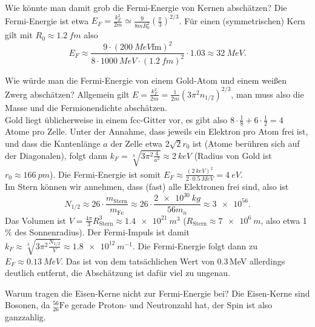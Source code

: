 \begin{fquestion}{Wie könnte man damit grob die Fermi-Energie von Kernen abschätzen?}
    Die Fermi-Energie ist etwa $E_F=\frac{k_F^2}{2m} \simeq \frac{9}{8mR_0^2} \left(\frac{\pi}{3}\right)^{2/3}$.
    Für einen (symmetrischen) Kern gilt mit $R_0 \approx \SI{1.2}{fm}$ also 
    $$E_F \approx \frac{9\cdot (\SI{200}{MeV\femto\metre})^2}{8\cdot \SI{1000}{MeV} \cdot (\SI{1.2}{fm})^2 } \cdot 1.03 \approx \SI{32}{MeV}. $$
\end{fquestion}

\begin{fquestion}{Wie würde man die Fermi-Energie von einem Gold-Atom und einem weißen Zwerg abschätzen?}
    Allgemein gilt $E = \frac{k_F^2}{2m} = \frac{1}{2m} \left( 3\pi^2 n_{1/2} \right)^{2/3}$, man muss also die Masse und die Fermionendichte abschätzen.
    \\
    Gold liegt üblicherweise in einem fcc-Gitter vor, es gibt also $8\cdot \frac{1}{8} + 6\cdot\frac{1}{2} = 4$ Atome pro Zelle.
    Unter der Annahme, dass jeweils ein Elektron pro Atom frei ist, und dass die Kantenlänge $a$ der Zelle etwa $2\sqrt{2} r_0$ ist (Atome berühren sich auf der Diagonalen), folgt dann $k_F = \sqrt[3]{3\pi^2 \frac{4}{a^3}} \approx \SI{2}{keV}$ (Radius von Gold ist $r_0\approx \SI{166}{pm}$).
    Die Fermi-Energie ist somit $E_F \approx \frac{(\SI{2}{keV})^2}{2\cdot \SI{0.5}{MeV}} = \SI{4}{eV}.$
    \\
    Im Stern können wir annehmen, dass (fast) alle Elektronen frei sind, also ist 
    $$N_{1/2} \approx 26\cdot \frac{m_\mathrm{Stern}}{m_\mathrm{Fe}} \approx 26\cdot \frac{\SI{2e30}{kg}}{56m_n} \approx \SI{3e56}.$$
    Das Volumen ist $V = \frac{4\pi }{3} R_\mathrm{Stern}^3 \approx \SI{1.4e21}{m^3}$ ($R_\mathrm{Stern} \approx \SI{7e6}{m}$, also etwa 1\,\% des Sonnenradius).
    Der Fermi-Impuls ist damit $k_F \approx \sqrt[3]{3\pi^2 \frac{N_{1/2} }{V}} \approx \SI{1.8e12}{m^{-1}}$.
    Die Fermi-Energie folgt dann zu $E_F \approx \SI{0.13}{MeV}$.
    Das ist von dem tatsächlichen Wert von $0.3\,$MeV allerdings deutlich entfernt, die Abschätzung ist dafür viel zu ungenau.
\end{fquestion}

\begin{fquestion}{Warum tragen die Eisen-Kerne nicht zur Fermi-Energie bei?}
    Die Eisen-Kerne sind Bosonen, da ${}^{56}_{26}\mathrm{Fe}$ gerade Proton- und Neutronzahl hat, der Spin ist also ganzzahlig.
\end{fquestion}

